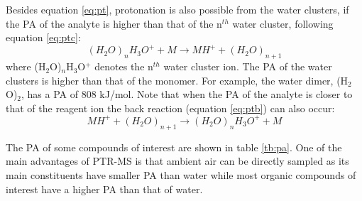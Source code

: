 Besides equation \ref{eq:pt}, protonation is also possible from the water clusters, if the PA of the analyte is higher than that of the n$^{th}$ water cluster, following equation \ref{eq:ptc}:
\begin{equation}
\label{eq:ptc}
(H_2O)_{n}H_3O^+ + M  \rightarrow MH^+ + (H_2O)_{n+1}
\end{equation}
where (H$_2$O)$_{n}$H$_3$O$^+$ denotes the n$^{th}$ water cluster ion. The PA of the water clusters is higher than that of the monomer. For example, the water dimer, (H$_2$O)$_{2}$, has a PA of 808 kJ/mol. Note that when the PA of the analyte is closer to that of the reagent ion the back reaction (equation \ref{eq:ptb}) can also occur:
\begin{equation}
\label{eq:ptb}
MH^+ + (H_2O)_{n+1} \rightarrow (H_2O)_{n}H_3O^+ + M 
\end{equation}





The PA of some compounds of interest are shown in table \ref{tb:pa}. One of the main advantages of PTR-MS is that ambient air can be directly sampled as its main constituents have smaller PA than water while most organic compounds of interest have a higher PA than that of water.

